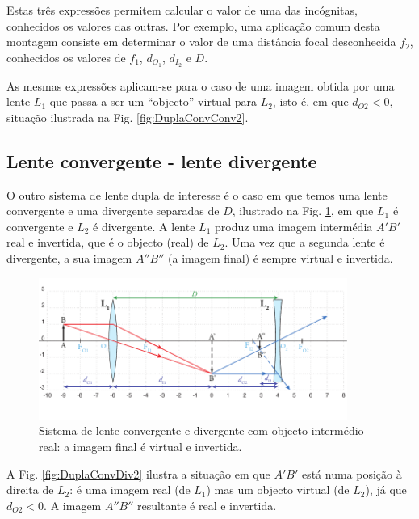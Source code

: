 \documentclass[a4paper,twoside,11pt]{report}      %
\begin{document}
Estas três expressões permitem calcular o valor de uma das incógnitas, conhecidos os valores das outras. Por exemplo, uma aplicação comum desta montagem consiste em determinar o valor de uma distância focal desconhecida $f_2$, conhecidos os valores de $f_1$, $d_{O_1}$, $d_{I_2}$ e $D$.

As mesmas expressões aplicam-se para o caso de uma imagem obtida por uma lente $L_1$ que passa a ser um “objecto” virtual para $L_2$, isto é, em que $d_{O2}<0$, situação ilustrada na Fig. \ref{fig:DuplaConvConv2}.



\subsection{\sf Lente convergente - lente divergente}
O outro sistema de lente dupla de interesse é o caso em que temos uma lente convergente e uma divergente separadas de $D$, ilustrado na Fig. \ref{fig:DuplaConvDiv1}, em que $L_1$ é convergente e $L_2$ é divergente. A lente $L_1$ produz uma imagem intermédia $A'B'$ real e invertida, que é o objecto (real) de $L_2$. Uma vez que a segunda lente é divergente, a sua imagem $A''B''$ (a imagem final) é sempre virtual e invertida.

\begin{figure}	[t]  \centering 
	\includegraphics[width=0.9\textwidth]{11-DuplaConvDiv1}
	\caption{Sistema de lente convergente e divergente  com objecto intermédio real: a imagem final é virtual e invertida. \label{fig:DuplaConvDiv1}} 
\end{figure}

A Fig. \ref{fig:DuplaConvDiv2} ilustra a situação em que $A'B'$ está numa posição à direita de $L_2$: é uma imagem real (de $L_1$) mas um objecto virtual (de $L_2$), já que $d_{O2}<0$. A imagem $A''B''$ resultante é real e invertida.
\end{document}
